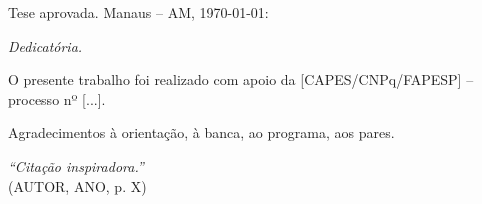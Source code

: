 \documentclass[
    12pt,
    openright,
    twoside,
    a4paper,
    chapter=TITLE,
    sumario=tradicional,
    section=TITLE,
    english,
    brazil
]{abntex2}
\begin{document}
\frenchspacing

\pretextual
\imprimircapa
\imprimirfolhaderosto

\begin{folhadeaprovacao}
\begin{center}
{\ABNTEXchapterfont\large\imprimirautor}
\vspace*{\fill}
\begin{center}
\ABNTEXchapterfont\bfseries\Large\imprimirtitulo
\end{center}
\vspace*{\fill}

\hspace{.45\textwidth}\begin{minipage}{.5\textwidth}
\imprimirpreambulo
\end{minipage}\vspace*{\fill}
\end{center}

Tese aprovada. Manaus -- AM, \today:

\assinatura{\textbf{\imprimirorientadorRotulo} \\ \imprimirorientador}
\end{folhadeaprovacao}

\begin{dedicatoria}\vspace*{\fill}\centering\textit{Dedicatória.}\vspace*{\fill}\end{dedicatoria}

\begin{agradecimentos}
O presente trabalho foi realizado com apoio da [CAPES/CNPq/FAPESP]
-- processo nº [...].

Agradecimentos à orientação, à banca, ao programa, aos pares.
\end{agradecimentos}

\begin{epigrafe}\vspace*{\fill}\begin{flushright}
\textit{``Citação inspiradora.''} \\ (AUTOR, ANO, p. X)
\end{flushright}\end{epigrafe}
\end{document}
